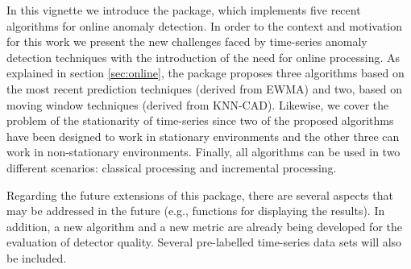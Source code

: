 \documentclass[a4paper]{article}\usepackage[]{graphicx}\usepackage[]{color}
\begin{document}
In this vignette we introduce the  package, which implements five recent algorithms for online anomaly detection. In order to the context and motivation for this work we present the new challenges faced by time-series anomaly detection techniques with the introduction of the need for online processing. As explained in section \ref{sec:online}, the package proposes three algorithms based on the most recent prediction techniques (derived from EWMA) and two, based on moving window techniques (derived from KNN-CAD). Likewise, we cover the problem of the stationarity of time-series since two of the proposed algorithms have been designed to work in stationary environments and the other three can work in non-stationary environments. Finally, all algorithms can be used in two different scenarios: classical processing and incremental processing.

Regarding the future extensions of this package, there are several aspects that may be addressed in the future  (e.g., functions for displaying the results). In addition, a new algorithm and a new metric are already being developed for the evaluation of detector quality. Several pre-labelled time-series data sets will also be included.



\end{document}
